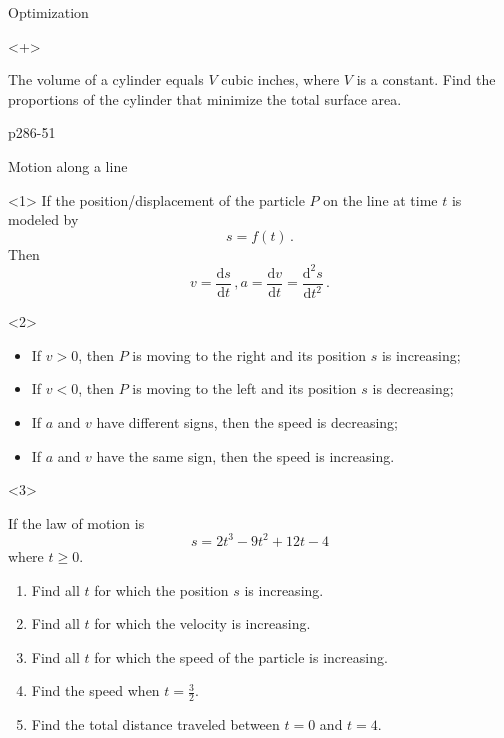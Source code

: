 \begin{frame}{Optimization}
\begin{onlyenv}<+>

\begin{example}
The volume of a cylinder equals $V$ cubic inches, where $V$ is a
constant. Find the proportions of the cylinder that minimize the total
surface area.
\end{example}



\begin{example}
p286-51
\end{example}

\end{onlyenv}

\end{frame}

\begin{frame}{Motion along a line}
\begin{onlyenv}<1>
If the position/displacement of the particle $P$ on the line at time $t$ is modeled by
\[
s=f\left(t\right)\,.
\]
Then
\[
v=\frac{\mathrm{d}s}{\mathrm{d}t}\,,a=\frac{\mathrm{d}v}{\mathrm{d}t}=\frac{\mathrm{d}^{2}s}{\mathrm{d}t^{2}}\,.
\]
\end{onlyenv}

\begin{onlyenv}<2>
\begin{itemize}
\item If $v>0$, then $P$ is moving to the right and its position $s$
is increasing;
\item If $v<0$, then $P$ is moving to the left and its position $s$ is
decreasing;
\item If $a$ and $v$ have different signs, then the speed is decreasing;
\item If $a$ and $v$ have the same sign, then the speed is increasing.
\end{itemize}
\end{onlyenv}

\begin{onlyenv}<3>
\begin{example}
If the law of motion is
\[
s=2t^{3}-9t^{2}+12t-4
\]
where $t\ge0$.
\begin{enumerate}
\item Find all $t$ for which the position $s$ is increasing.
\item Find all $t$ for which the velocity is increasing.
\item Find all $t$ for which the speed of the particle is increasing.
\item Find the speed when $t=\frac{3}{2}$.
\item Find the total distance traveled between $t=0$ and $t=4$.
\end{enumerate}
\end{example}
\end{onlyenv}
\end{frame}

